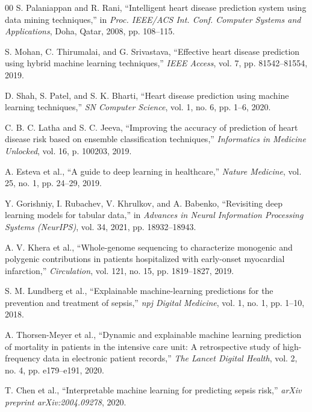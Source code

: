 \documentclass[conference]{IEEEtran}
\begin{document}
\begin{thebibliography}{00}
S. Palaniappan and R. Rani, ``Intelligent heart disease prediction system using data mining techniques,'' in \textit{Proc. IEEE/ACS Int. Conf. Computer Systems and Applications}, Doha, Qatar, 2008, pp. 108--115.

S. Mohan, C. Thirumalai, and G. Srivastava, ``Effective heart disease prediction using hybrid machine learning techniques,'' \textit{IEEE Access}, vol. 7, pp. 81542--81554, 2019.

D. Shah, S. Patel, and S. K. Bharti, ``Heart disease prediction using machine learning techniques,'' \textit{SN Computer Science}, vol. 1, no. 6, pp. 1--6, 2020.

C. B. C. Latha and S. C. Jeeva, ``Improving the accuracy of prediction of heart disease risk based on ensemble classification techniques,'' \textit{Informatics in Medicine Unlocked}, vol. 16, p. 100203, 2019.

A. Esteva et al., ``A guide to deep learning in healthcare,'' \textit{Nature Medicine}, vol. 25, no. 1, pp. 24--29, 2019.

Y. Gorishniy, I. Rubachev, V. Khrulkov, and A. Babenko, ``Revisiting deep learning models for tabular data,'' in \textit{Advances in Neural Information Processing Systems (NeurIPS)}, vol. 34, 2021, pp. 18932--18943.

A. V. Khera et al., ``Whole-genome sequencing to characterize monogenic and polygenic contributions in patients hospitalized with early-onset myocardial infarction,'' \textit{Circulation}, vol. 121, no. 15, pp. 1819--1827, 2019.

S. M. Lundberg et al., ``Explainable machine-learning predictions for the prevention and treatment of sepsis,'' \textit{npj Digital Medicine}, vol. 1, no. 1, pp. 1--10, 2018.

A. Thorsen-Meyer et al., ``Dynamic and explainable machine learning prediction of mortality in patients in the intensive care unit: A retrospective study of high-frequency data in electronic patient records,'' \textit{The Lancet Digital Health}, vol. 2, no. 4, pp. e179--e191, 2020.

T. Chen et al., ``Interpretable machine learning for predicting sepsis risk,'' \textit{arXiv preprint arXiv:2004.09278}, 2020.


\end{thebibliography}
\end{document}
